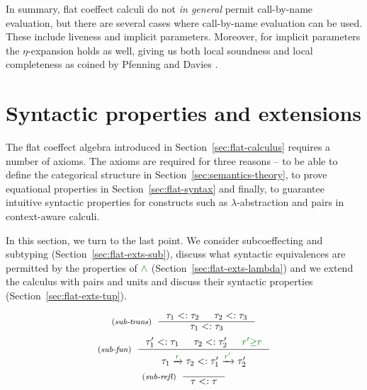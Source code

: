 \noindent
In summary, flat coeffect calculi do not \emph{in general} permit call-by-name evaluation, but
there are several cases where call-by-name evaluation can be used. 
These include liveness and implicit parameters. Moreover, for implicit parameters the
$\eta$-expansion holds as well, giving us both local soundness and local completeness as coined
by Pfenning and Davies \cite{logic-modal-reconstruction}.



%
%

\section{Syntactic properties and extensions}
\label{sec:flat-exts}

The flat coeffect algebra introduced in Section~\ref{sec:flat-calculus} requires a number of axioms.
The axioms are required for three reasons -- to be able to define the categorical structure
in Section~\ref{sec:semantics-theory}, to prove equational properties in Section~\ref{sec:flat-syntax}
and finally, to guarantee intuitive syntactic properties for constructs such as
$\lambda$-abstraction and pairs in context-aware calculi.

In this section, we turn to the last point. We consider subcoeffecting and subtyping
(Section~\ref{sec:flat-exts-sub}), discuss what syntactic equivalences are permitted
by the properties of $\czip$ (Section~\ref{sec:flat-exts-lambda}) and we extend the calculus with
pairs and units and discuss their syntactic properties (Section~\ref{sec:flat-exts-tup}).


\begin{figure}[t]
\begin{equation*}
\tyrule{sub-trans}
  { \tau_1 <: \tau_2 & \tau_2 <: \tau_3 }
  { \tau_1 <: \tau_3  }
\end{equation*}
\begin{equation*}
\tyrule{sub-fun}
  { \tau_1' <: \tau_1 & \tau_2 <: \tau_2' & \cclrd{r'} \cgeq \cclrd{r} }
  { \tau_1 \xrightarrow{\cclrd{r}} \tau_2 <: \tau_1' \xrightarrow{\cclrd{r'}} \tau_2' }
\end{equation*}
\begin{equation*}
\tyrule{sub-refl}
  { }
  { \tau <: \tau }
\end{equation*}

\label{fig:flat-types-sub}
\end{figure}

